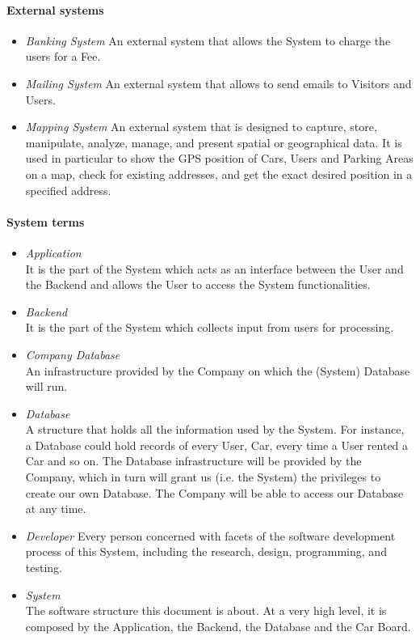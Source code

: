 \paragraph{External systems}
	\begin{itemize}
		\item \emph{Banking System}
		An external system that allows the System to charge the users for a Fee.
		
		\item \emph{Mailing System}
		An external system that allows to send emails to Visitors and Users.
	
		\item \emph{Mapping System}
		An external system that is designed to capture, store, manipulate, analyze, manage, and present spatial or geographical data. 
		It is used in particular to show the GPS position of Cars, Users and Parking Areas on a map, check for existing addresses, and get the exact desired position in a specified address.
	\end{itemize}
	
\paragraph{System terms}
	\begin{itemize}
		\item \emph{Application} \\
		It is the part of the System which acts as an interface between the User and the Backend and allows the User to access the System functionalities.

		\item \emph{Backend}\\
		It is the part of the System which collects input from users for processing.
		
		\item \emph{Company Database} \\
		An infrastructure provided by the Company on which the (System) Database will run.
		
		\item \emph{Database} \\
		A structure that holds all the information used by the System. For instance, a Database could hold records of every User, Car, every time a User rented a Car and so on. The Database infrastructure will be provided by the Company, which in turn will grant us (i.e. the System) the privileges to create our own Database. The Company will be able to access our Database at any time.
		
		\item \emph{Developer}
		Every person concerned with facets of the software development process of this System, including the research, design, programming, and testing. 
		
		\item \emph{System}\\
		The software structure this document is about. At a very high level, it is composed by the Application, the Backend, the Database and the Car Board.
		
	\end{itemize}
